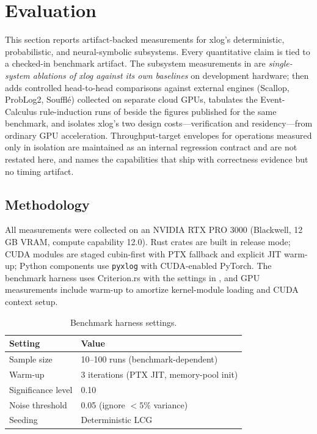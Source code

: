 \section{Evaluation}\label{sec:eval}

This section reports artifact-backed measurements for xlog's deterministic, probabilistic, and neural-symbolic subsystems. Every quantitative claim is tied to a checked-in benchmark artifact. The subsystem measurements in  are \emph{single-system ablations of xlog against its own baselines} on development hardware;  then adds controlled head-to-head comparisons against external engines (Scallop, ProbLog2, Soufflé) collected on separate cloud GPUs,  tabulates the Event-Calculus rule-induction runs of  beside the figures published for the same benchmark, and  isolates xlog's two design costs---verification and residency---from ordinary GPU acceleration. Throughput-target envelopes for operations measured only in isolation are maintained as an internal regression contract and are not restated here, and  names the capabilities that ship with correctness evidence but no timing artifact.

\subsection{Methodology}

All measurements were collected on an NVIDIA RTX PRO 3000 (Blackwell, 12\,GB VRAM, compute capability 12.0). Rust crates are built in release mode; CUDA modules are staged cubin-first with PTX fallback and explicit JIT warm-up; Python components use \texttt{pyxlog} with CUDA-enabled PyTorch. The benchmark harness uses Criterion.rs with the settings in , and GPU measurements include warm-up to amortize kernel-module loading and CUDA context setup.

\begin{table}[htbp]
  \centering
  \caption{Benchmark harness settings.}
  \label{tab:stat-protocol}
  \small
  \begin{tabular}{@{}ll@{}}
    \toprule
    \textbf{Setting} & \textbf{Value} \\
    \midrule
    Sample size       & 10--100 runs (benchmark-dependent) \\
    Warm-up           & 3 iterations (PTX JIT, memory-pool init) \\
    Significance level & 0.10 \\
    Noise threshold   & 0.05 (ignore ${<}5\%$ variance) \\
    Seeding           & Deterministic LCG \\
    \bottomrule
  \end{tabular}
\end{table}

